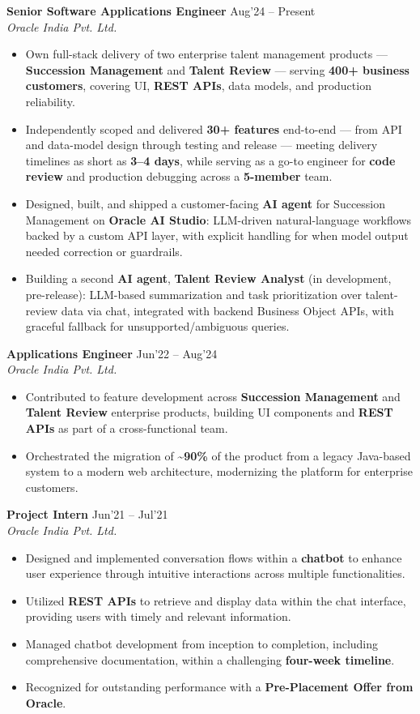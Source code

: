\documentclass[10pt,a4paper]{article}
\newcommand{\resumeItem}[1]{\item[\textcolor{primary}{\textbullet}] #1}
\begin{document}
\textbf{Senior Software Applications Engineer} \hfill Aug'24 -- Present\\
\textit{Oracle India Pvt. Ltd.}
\begin{itemize}[leftmargin=1.05em, nosep, topsep=0pt, itemsep=0pt, parsep=0pt]
    \resumeItem{Own full-stack delivery of two enterprise talent management products --- \textbf{Succession Management} and \textbf{Talent Review} --- serving \textbf{400+ business customers}, covering UI, \textbf{REST APIs}, data models, and production reliability.}
    \resumeItem{Independently scoped and delivered \textbf{30+ features} end-to-end --- from API and data-model design through testing and release --- meeting delivery timelines as short as \textbf{3--4 days}, while serving as a go-to engineer for \textbf{code review} and production debugging across a \textbf{5-member} team.}
    \resumeItem{Designed, built, and shipped a customer-facing \textbf{AI agent} for Succession Management on \textbf{Oracle AI Studio}: LLM-driven natural-language workflows backed by a custom API layer, with explicit handling for when model output needed correction or guardrails.}
    \resumeItem{Building a second \textbf{AI agent}, \textbf{Talent Review Analyst} (in development, pre-release): LLM-based summarization and task prioritization over talent-review data via chat, integrated with backend Business Object APIs, with graceful fallback for unsupported/ambiguous queries.}
\end{itemize}

\vspace{1pt}
\textbf{Applications Engineer} \hfill Jun'22 -- Aug'24\\
\textit{Oracle India Pvt. Ltd.}
\begin{itemize}[leftmargin=1.05em, nosep, topsep=0pt, itemsep=0pt, parsep=0pt]
    \resumeItem{Contributed to feature development across \textbf{Succession Management} and \textbf{Talent Review} enterprise products, building UI components and \textbf{REST APIs} as part of a cross-functional team.}
    \resumeItem{Orchestrated the migration of \textbf{\textasciitilde90\%} of the product from a legacy Java-based system to a modern web architecture, modernizing the platform for enterprise customers.}
\end{itemize}

\vspace{1pt}
\textbf{Project Intern} \hfill Jun'21 -- Jul'21\\
\textit{Oracle India Pvt. Ltd.}
\begin{itemize}[leftmargin=1.05em, nosep, topsep=0pt, itemsep=0pt, parsep=0pt]
    \resumeItem{Designed and implemented conversation flows within a \textbf{chatbot} to enhance user experience through intuitive interactions across multiple functionalities.}
    \resumeItem{Utilized \textbf{REST APIs} to retrieve and display data within the chat interface, providing users with timely and relevant information.}
    \resumeItem{Managed chatbot development from inception to completion, including comprehensive documentation, within a challenging \textbf{four-week timeline}.}
    \resumeItem{Recognized for outstanding performance with a \textbf{Pre-Placement Offer from Oracle}.}
\end{itemize}
\end{document}
